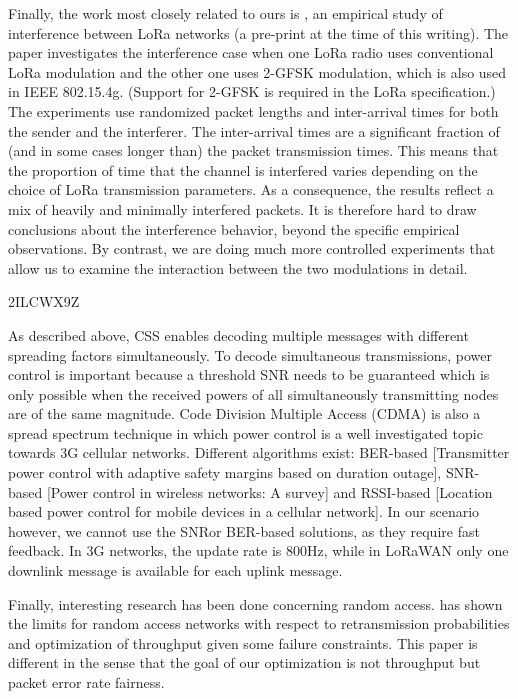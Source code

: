 Finally,
	the work most closely related to ours is \cite{mikhaylov_lorawan_2017},
	an empirical study of interference between LoRa networks (a pre-print at the time of this writing).
The paper investigates the interference case when one LoRa radio uses conventional LoRa modulation and the other one uses 2-GFSK modulation,
	which is also used in IEEE 802.15.4g.
(Support for 2-GFSK is required in the LoRa specification.) The experiments use randomized packet lengths and inter-arrival times for both the sender and the interferer.
The inter-arrival times are a significant fraction of (and in some cases longer than) the packet transmission times.
This means that the proportion of time that the channel is interfered varies depending on the choice of LoRa transmission parameters.
As a consequence,
	the results reflect a mix of heavily and minimally interfered packets.
It is therefore hard to draw conclusions about the interference behavior,
	beyond the specific empirical observations.
By contrast,
	we are doing much more controlled experiments that allow us to examine the interaction between the two modulations in detail.

\cite{reynders_power_2017} 2ILCWX9Z

As described above,
	CSS enables decoding multiple messages with different spreading factors simultaneously.
To decode simultaneous transmissions,
	power control is important because a threshold SNR needs to be guaranteed which is only possible when the received powers of all simultaneously transmitting nodes are of the same magnitude.
Code Division Multiple Access (CDMA) is also a spread spectrum technique in which power control is a well investigated topic towards 3G cellular networks.
Different algorithms exist:
	BER-based [Transmitter power control with adaptive safety margins based on duration outage],
	SNR-based [Power control in wireless networks:
	A survey] and RSSI-based [Location based power control for mobile devices in a cellular network].
In our scenario however,
	we cannot use the SNRor BER-based solutions,
	as they require fast feedback.
In 3G networks,
	the update rate is 800Hz,
	while in LoRaWAN only one downlink message is available for each uplink message.

Finally,
	interesting research has been done concerning random access.
\cite{dhillon_fundamentals_2014} has shown the limits for random access networks with respect to retransmission probabilities and optimization of throughput given some failure constraints.
This paper is different in the sense that the goal of our optimization is not throughput but packet error rate fairness.

